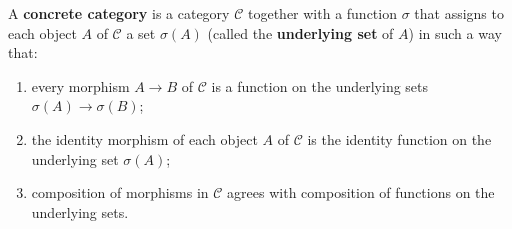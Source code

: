 \begin{definition}
A \textbf{concrete category} is a category $\mathcal{C}$ together with a function $\sigma$ that assigns to each object $A$ of $\mathcal{C}$ a set $\sigma(A)$ (called the \textbf{underlying set} of $A$) in such a way that:
\begin{enumerate}
    \item[(i)] every morphism $A \rightarrow B$ of $\mathcal{C}$ is a function on the underlying sets $\sigma(A) \rightarrow \sigma(B)$;
    \item[(ii)] the identity morphism of each object $A$ of $\mathcal{C}$ is the identity function on the underlying set $\sigma(A)$;
    \item[(iii)] composition of morphisms in $\mathcal{C}$ agrees with composition of functions on the underlying sets.
\end{enumerate}
\end{definition}

